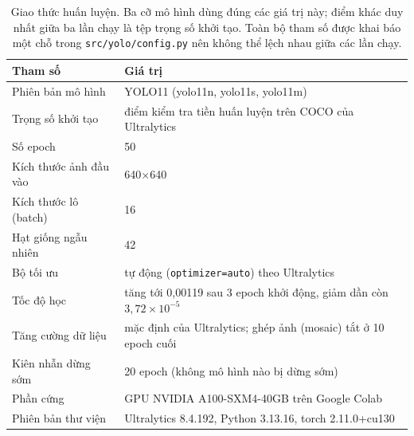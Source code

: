 \begin{table}[H]
\centering
\caption{Giao thức huấn luyện. Ba cỡ mô hình dùng đúng các giá trị này; điểm khác duy nhất giữa ba lần chạy là tệp trọng số khởi tạo. Toàn bộ tham số được khai báo một chỗ trong \texttt{src/yolo/config.py} nên không thể lệch nhau giữa các lần chạy.}
\label{tab:protocol}
\small
\begin{tabular}{l l}
\toprule
Tham số & Giá trị \\
\midrule
Phiên bản mô hình & YOLO11 (yolo11n, yolo11s, yolo11m) \\
Trọng số khởi tạo & điểm kiểm tra tiền huấn luyện trên COCO của Ultralytics \\
Số epoch & 50 \\
Kích thước ảnh đầu vào & 640$\times$640 \\
Kích thước lô (batch) & 16 \\
Hạt giống ngẫu nhiên & 42 \\
Bộ tối ưu & tự động (\texttt{optimizer=auto}) theo Ultralytics \\
Tốc độ học & tăng tới 0{,}00119 sau 3 epoch khởi động, giảm dần còn $3{,}72\times 10^{-5}$ \\
Tăng cường dữ liệu & mặc định của Ultralytics; ghép ảnh (mosaic) tắt ở 10 epoch cuối \\
Kiên nhẫn dừng sớm & 20 epoch (không mô hình nào bị dừng sớm) \\
Phần cứng & GPU NVIDIA A100-SXM4-40GB trên Google Colab \\
Phiên bản thư viện & Ultralytics 8.4.192, Python 3.13.16, torch 2.11.0+cu130 \\
\bottomrule
\end{tabular}
\end{table}
